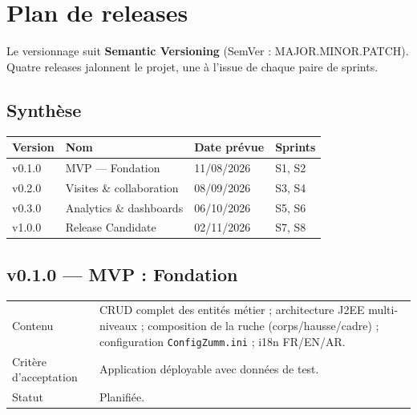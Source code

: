 \chapter{Plan de releases}
\label{chap:releases}

Le versionnage suit \textbf{Semantic Versioning} (SemVer :
MAJOR.MINOR.PATCH). Quatre releases jalonnent le projet, une à l'issue de
chaque paire de sprints.

\section{Synthèse}

\begin{center}
\begin{tabular}{llll}
\toprule
\textbf{Version} & \textbf{Nom} & \textbf{Date prévue} & \textbf{Sprints} \\
\midrule
v0.1.0 & MVP --- Fondation          & 11/08/2026 & S1, S2 \\
v0.2.0 & Visites \& collaboration   & 08/09/2026 & S3, S4 \\
v0.3.0 & Analytics \& dashboards    & 06/10/2026 & S5, S6 \\
v1.0.0 & Release Candidate          & 02/11/2026 & S7, S8 \\
\bottomrule
\end{tabular}
\end{center}

\section{v0.1.0 --- MVP : Fondation}

\begin{center}
\begin{tabular}{lp{11cm}}
\toprule
Contenu &
  CRUD complet des entités métier ;
  architecture J2EE multi-niveaux ;
  composition de la ruche (corps/hausse/cadre) ;
  configuration \texttt{ConfigZumm.ini} ;
  i18n FR/EN/AR. \\
Critère d'acceptation & Application déployable avec données de test. \\
Statut & Planifiée. \\
\bottomrule
\end{tabular}
\end{center}

